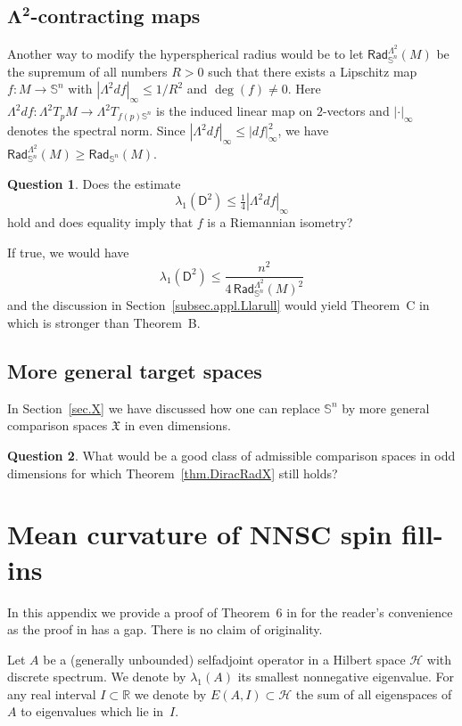 \documentclass[11pt,reqno]{amsart}
\newcommand{\HH}{\mathscr{H}}
\newcommand{\RadSn}{\mathsf{Rad}_{\Sn}}
\newcommand{\Sn}{\mathbb{S}^n}
\newcommand{\XX}{\mathfrak{X}}
\newcommand{\R}{\mathbb{R}}
\newcommand{\D}{\mathsf{D}}
\newcommand{\<}{\langle}
\renewcommand{\>}{\rangle}
\theoremstyle{definition}
\newtheorem{question}{Question}
\begin{document}
\subsection{\texorpdfstring{$\boldsymbol{\Lambda^2}$-contracting maps}{Λ²-contracting maps}}
Another way to modify the hyperspherical radius would be to let $\RadSn^{\Lambda^2}(M)$ be the supremum of all numbers $R>0$ such that there exists a Lipschitz map $f\colon M\to \Sn$ with $|\Lambda^2df|_\infty\le 1/R^2$ and $\deg(f)\neq0$.
Here $\Lambda^2df\colon \Lambda^2T_pM \to \Lambda^2 T_{f(p)\Sn}$ is the induced linear map on $2$-vectors and $|\cdot|_\infty$ denotes the spectral norm.
Since $|\Lambda^2df|_\infty\le|df|_\infty^2$, we have $\RadSn^{\Lambda^2}(M)\ge\RadSn(M)$.

\begin{question}
Does the estimate
$$
\lambda_1(\D^2) \le \tfrac14 |\Lambda^2 df|_\infty
$$
hold and does equality imply that $f$ is a Riemannian isometry?

If true, we would have
$$
\lambda_1(\D^2) \le \frac{n^2}{4\,\RadSn^{\Lambda^2}(M)^2}
$$
and the discussion in Section~\ref{subsec.appl.Llarull} would yield Theorem~C in \cite{Ll} which is stronger than Theorem~B.
\end{question}

\subsection{More general target spaces}
In Section~\ref{sec.X} we have discussed how one can replace $\Sn$ by more general comparison spaces $\XX$ in even dimensions.

\begin{question}
What would be a good class of admissible comparison spaces in odd dimensions for which Theorem~\ref{thm.DiracRadX} still holds?
\end{question}

\appendix

\section{Mean curvature of NNSC spin fill-ins}
\label{app.HMZ}

In this appendix we provide a proof of Theorem~6 in \cite{HMZ} for the reader's convenience as the proof in \cite{HMZ} has a gap.
There is no claim of originality.

Let $A$ be a (generally unbounded) selfadjoint operator in a Hilbert space $\HH$ with discrete spectrum.
We denote by $\lambda_1(A)$ its smallest nonnegative eigenvalue.
For any real interval $I\subset\R$ we denote by $E(A,I)\subset\HH$ the sum of all eigenspaces of $A$ to eigenvalues which lie in~$I$.
\end{document}
